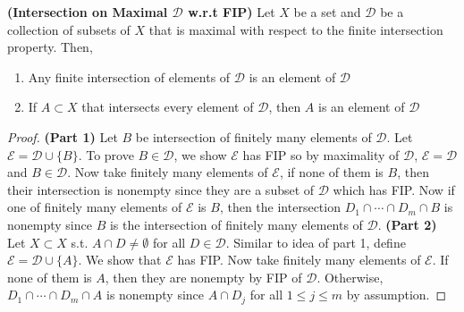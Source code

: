 \documentclass[10.5pt]{article}
\newcommand{\calD}{\mathcal{D}}
\newcommand{\calE}{\mathcal{E}}
\begin{document}
\begin{lemma*}
    \textbf{(Intersection on Maximal $\calD$ w.r.t FIP)} Let $X$ be a set and $\calD$ be a collection of subsets of $X$ that is maximal with respect to the finite intersection property. Then,
    \begin{enumerate}
        \item Any finite intersection of elements of $\calD$ is an element of $\calD$
        \item If $A\subset X$ that intersects every element of $\calD$, then $A$ is an element of $\calD$
    \end{enumerate}
    \begin{proof}
        \textbf{(Part 1)} Let $B$ be intersection of finitely many elements of $\calD$. Let $\calE = \calD \cup \{B\}$. To prove $B\in \calD$, we show $\calE$ has FIP so by maximality of $\calD$, $\calE=\calD$ and $B\in \calD$. Now take finitely many elements of $\calE$, if none of them is $B$, then their intersection is nonempty since they are a subset of $\calD$ which has FIP. Now if one of finitely many elements of $\calE$ is $B$, then the intersection $D_1 \cap \cdots \cap D_m \cap B$ is nonempty since $B$ is the intersection of finitely many elements of $\calD$. \textbf{(Part 2)} Let $X\subset X$ s.t. $A\cap D \neq \emptyset$ for all $D\in \calD$. Similar to idea of part 1, define $\calE = \calD \cup \{A\}$. We show that $\calE$ has FIP. Now take finitely many elements of $\calE$. If none of them is $A$, then they are nonempty by FIP of $\calD$. Otherwise, $D_1\cap \cdots \cap D_m \cap A$ is nonempty since $A\cap D_j$ for all $1\leq j\leq m$ by assumption.
    \end{proof}
\end{lemma*}
\end{document}
